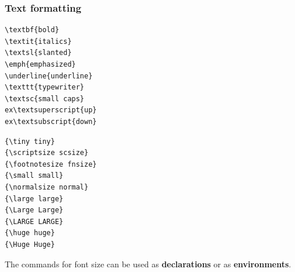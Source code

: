 \begin{frame}[fragile]
\frametitle{Text formatting}


\begin{multicols}{2}
	
\begin{lstlisting}
\textbf{bold} 
\textit{italics}
\textsl{slanted} 
\emph{emphasized} 
\underline{underline} 
\texttt{typewriter} 
\textsc{small caps} 
ex\textsuperscript{up} 
ex\textsubscript{down} 
\end{lstlisting}
	
	
\end{multicols}
\end{frame}


\begin{frame}[fragile]


\begin{multicols}{2}
\begin{lstlisting}
{\tiny tiny} 
{\scriptsize scsize} 
{\footnotesize fnsize} 
{\small small} 
{\normalsize normal} 
{\large large} 
{\Large Large} 
{\LARGE LARGE} 
{\huge huge} 
{\Huge Huge} 
\end{lstlisting} 
\columnbreak{}
\end{multicols}

The commands for font size can be used as \textbf{declarations} or as \textbf{environments}.
\end{frame}


